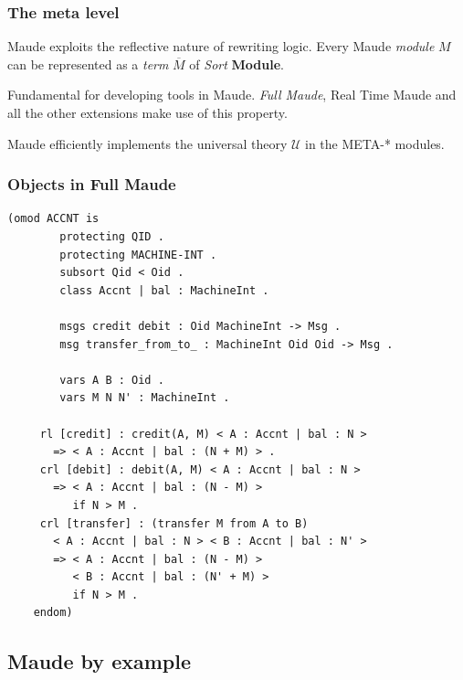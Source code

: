 \documentclass{beamer}
\begin{document}
\begin{frame}
    \frametitle{The meta level }
    Maude exploits the reflective nature of rewriting logic. Every Maude \emph{module} \textbf{$M$} can be represented  as 
    a \emph{term} \textbf{$\overline{M}$} of \emph{Sort} \textbf{Module}. 

    \bigskip
    \pause 
    Fundamental for developing tools in Maude. \emph{Full Maude}, Real Time Maude and all the 
    other extensions make use of this property.
    
    \pause
    \bigskip 
    Maude efficiently implements the universal theory $\mathcal{U}$ in the META-* modules.

\end{frame}
\begin{frame}[fragile]
    \scriptsize
    \frametitle{Objects in Full Maude}
    \begin{lstlisting}[language=maude]
    (omod ACCNT is 
        protecting QID .
        protecting MACHINE-INT .
        subsort Qid < Oid .
        class Accnt | bal : MachineInt .  
        
        msgs credit debit : Oid MachineInt -> Msg .  
        msg transfer_from_to_ : MachineInt Oid Oid -> Msg .  

        vars A B : Oid . 
        vars M N N' : MachineInt .  

     rl [credit] : credit(A, M) < A : Accnt | bal : N >
       => < A : Accnt | bal : (N + M) > .  
     crl [debit] : debit(A, M) < A : Accnt | bal : N >
       => < A : Accnt | bal : (N - M) >
          if N > M .  
     crl [transfer] : (transfer M from A to B)
       < A : Accnt | bal : N > < B : Accnt | bal : N' > 
       => < A : Accnt | bal : (N - M) > 
          < B : Accnt | bal : (N' + M) >
          if N > M . 
    endom)
    \end{lstlisting}
\end{frame}
\subsection{Maude by example}
\end{document}
